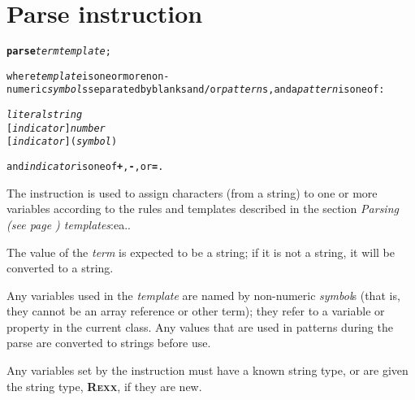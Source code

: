 \chapter{Parse instruction}\label{refparse}
\begin{shaded}
\begin{alltt}
\textbf{parse} \emph{term} \emph{template};

where \emph{template} is one or more non-numeric \emph{symbol}s separated by blanks and/or \emph{pattern}s, and a \emph{pattern} is one of:

    \emph{literalstring}
    [\emph{indicator}] \emph{number}
    [\emph{indicator}] (\emph{symbol})

and \emph{indicator} is one of \textbf{+}, \textbf{-}, or \textbf{=}.
\end{alltt}
\end{shaded}
 The  instruction is used to assign characters (from a
string) to one or more variables according to the rules and templates
described in the section  \emph{Parsing (see page \pageref{refparsing}) 
templates}:ea..
 
The value of the \emph{term} is expected to be a string; if it is
not a string, it will be converted to a string.
 
Any variables used in the \emph{template} are named by non-numeric
\emph{symbol}s (that is, they cannot be an array reference or other
term); they refer to a variable or property in the current class.
Any values that are used in patterns during the parse are converted to
strings before use.
 
Any variables set by the  instruction must have a known
string type, or are given the \nr{} string type, \textbf{R\textsc{exx}}, if
they are new.
 
